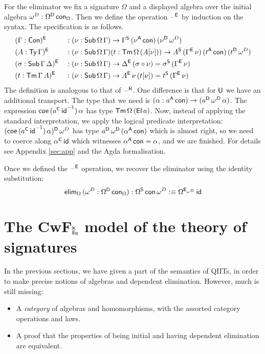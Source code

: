 \documentclass[acmsmall,review,anonymous]{acmart}\settopmatter{printfolios=true,printccs=false,printacmref=false}
\begin{document}
For the eliminator we fix a signature $\Omega$ and a displayed algebra
over the initial algebra $\omega^D:\Omega^{\mathsf{D}}\,\mathsf{con}_\Omega$. Then we
define the operation $\mathord{\hspace{1pt}\text{--}\hspace{1pt}}^{\mathsf{E}}$ by induction on the syntax. The
specification is as follows.
\begin{alignat*}{5}
  & (\Gamma:\mathsf{Con})^{\mathsf{E}} && : (\nu:\mathsf{Sub}\,\Omega\,\Gamma)\rightarrow \Gamma^{\mathsf{S}}\,(\nu^{\mathsf{A}}\,\mathsf{con})\,(\nu^{\mathsf{D}}\,\omega^D) \\
  & (A:\mathsf{Ty}\,\Gamma)^{\mathsf{E}} && : (\nu:\mathsf{Sub}\,\Omega\,\Gamma)(t:\mathsf{Tm}\,\Omega\,(A[\nu]))\rightarrow A^{\mathsf{S}}\,(\Gamma^{\mathsf{E}}\,\nu)\,(t^{\mathsf{A}}\,\mathsf{con})\,(t^{\mathsf{D}}\,\omega^D) \\
  & (\sigma:\mathsf{Sub}\,\Gamma\,\Delta)^{\mathsf{E}} && : (\nu:\mathsf{Sub}\,\Omega\,\Gamma)\rightarrow \Delta^{\mathsf{E}}\,(\sigma\circ\nu) = \sigma^{\mathsf{S}}\,(\Gamma^{\mathsf{E}}\,\nu) \\
  & (t:\mathsf{Tm}\,\Gamma\,A)^{\mathsf{E}} && : (\nu:\mathsf{Sub}\,\Omega\,\Gamma)\rightarrow A^{\mathsf{E}}\,\nu\,(t[\nu]) = t^{\mathsf{S}}\,(\Gamma^{\mathsf{E}}\,\nu)
\end{alignat*}
The definition is analogous to that of $\mathord{\hspace{1pt}\text{--}\hspace{1pt}}^{\mathsf{R}}$. One difference is
that for $\mathsf{U}$ we have an additional transport. The type that we need
is $(\alpha:a^{\mathsf{A}}\,\mathsf{con})\rightarrow (a^{\mathsf{D}}\,\omega^D\,\alpha)$. The expression
$\mathsf{coe}\,({a^{\mathsf{C}}\,\mathsf{id}}^{-1})\,\alpha$ has type
$\mathsf{Tm}\,\Omega\,(\mathsf{El}\,a)$. Now, instead of applying the standard
interpretation, we apply the logical predicate interpretation:
$(\mathsf{coe}\,({a^{\mathsf{C}}\,\mathsf{id}}^{-1})\,\alpha)^{\mathsf{D}}\,\omega^D$ has type
$a^{\mathsf{D}}\,\omega^{\mathsf{D}}\,(\alpha^{\mathsf{A}}\,\mathsf{con})$ which is almost right, so we need
to coerce along $\alpha^{\mathsf{C}}\,\mathsf{id}$ which witnesses $\alpha^{\mathsf{A}}\,\mathsf{con} =
\alpha$, and we are finished. For details see Appendix \ref{sec:app}
and the Agda formalisation.

Once we defined the $\mathord{\hspace{1pt}\text{--}\hspace{1pt}}^{\mathsf{E}}$ operation, we recover the eliminator
using the identity substitution:
\[
\mathsf{elim}_\Omega\,(\omega^D:\Omega^{\mathsf{D}}\,\mathsf{con}_\Omega): \Omega^{\mathsf{S}}\,\mathsf{con}\,\omega^D :\equiv \Omega^{\mathsf{E}_{\omega^D}}\,\mathsf{id}
\]


\section{The CwF$^{\mathsf{K}}_{\mathsf{Eq}}$ model of the theory of signatures}
\label{sec:category}

In the previous sections, we have given a part of the semantics of QIITs, in order to make precise notions of algebras and dependent elimination. However, much is still missing:

\begin{itemize}
\item A \emph{category} of algebras and homomorphisms, with the assorted category operations and laws.
\item A proof that the properties of being initial and having dependent elimination are equivalent.
\end{itemize}
\end{document}
